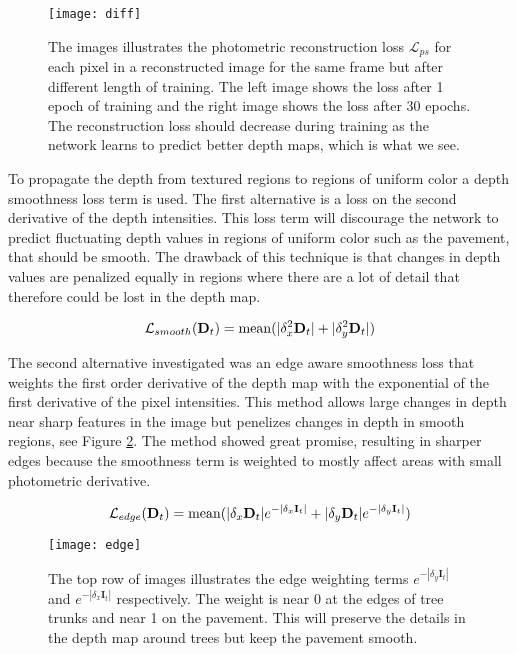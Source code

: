 \begin{figure}[H]
	\centering
	\texttt{[image: diff]}
	\caption{The images illustrates the photometric reconstruction loss $ \mathcal{L}_{ps} $ for each pixel in a reconstructed image for the same frame but after different length of training. The left image shows the loss after 1 epoch of training and the right image shows the loss after 30 epochs. The reconstruction loss should decrease during training as the network learns to predict better depth maps, which is what we see.}
	\label{fig:diff}
\end{figure}

To propagate the depth from textured regions to regions of uniform color a depth smoothness loss term is used. The first alternative is a loss on the second derivative of the depth intensities. This loss term will discourage the network to predict fluctuating depth values in regions of uniform color such as the pavement, that should be smooth. The drawback of this technique is that changes in depth values are penalized equally in regions where there are a lot of detail that therefore could be lost in the depth map.

\begin{equation}
\mathcal{L}_{smooth}(\textbf{D}_t)=\operatorname{mean}(|\delta_x^2 \textbf{D}_t|+|\delta_y^2 \textbf{D}_t|)
\end{equation}

The second alternative investigated was an edge aware smoothness loss that weights the first order derivative of the depth map with the exponential of the first derivative of the pixel intensities. This method allows large changes in depth near sharp features in the image but penelizes changes in depth in smooth regions, see Figure \ref{fig:edge}. The method showed great promise, resulting in sharper edges because the smoothness term is weighted to mostly affect areas with small photometric derivative.

\begin{equation}
\mathcal{L}_{edge}(\textbf{D}_t)=\operatorname{mean}(|\delta_x \textbf{D}_t|e^{-|\delta_x \textbf{I}_t|} + |\delta_y \textbf{D}_t|e^{-|\delta_y \textbf{I}_t|})
\end{equation}

\begin{figure}[H]
	\centering
	\texttt{[image: edge]}
	\caption{The top row of images illustrates the edge weighting terms $e^{-|\delta_y \textbf{I}_t|}$ and $e^{-|\delta_x \textbf{I}_t|}$ respectively. The weight is near 0 at the edges of tree trunks and near 1 on the pavement. This will preserve the details in the depth map around trees but keep the pavement smooth.}
	\label{fig:edge}
\end{figure}

